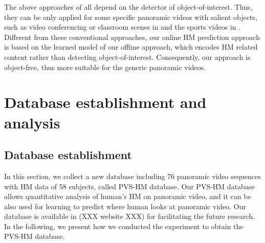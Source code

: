 \documentclass[10pt,journal,compsoc]{IEEEtran}
\begin{document}
The above approaches of \cite{foote2000flycam, sun2005region, su2016pano2vid, hu2017deep, lin2017tell}  all depend on the detector of object-of-interest. Thus, they can be only applied for some specific panoramic videos with salient objects, such as video conferencing or classroom scenes in \cite{foote2000flycam, sun2005region} and the sports videos in \cite{su2016pano2vid, hu2017deep, lin2017tell}. Different from these conventional approaches, our online HM prediction approach is based on the learned model of our offline approach, which encodes HM related content rather than detecting object-of-interest. Consequently, our approach is object-free, thus more suitable for the generic panoramic videos.










\section{Database establishment and analysis}
\label{Database_establishment_and_analysis}

\subsection{Database establishment}
\label{Database_establishment}

In this section, we collect a new database including 76 panoramic video sequences with HM data of 58 subjects, called PVS-HM database. Our PVS-HM database allows quantitative analysis of human's HM on panoramic video, and it can be also used for learning to predict where human looks at panoramic video. Our database is available in  (XXX website XXX) for facilitating the future research. In the following, we present how we conducted the experiment to obtain the PVS-HM database.
\end{document}
